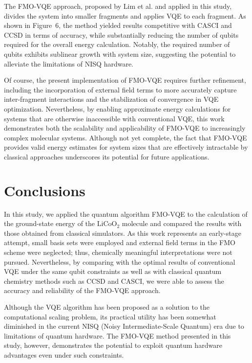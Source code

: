 \documentclass[pdflatex,sn-mathphys-num]{sn-jnl}%
\theoremstyle{thmstyleone}%
\theoremstyle{thmstyletwo}%
\theoremstyle{thmstylethree}%
\begin{document}
The FMO-VQE approach, proposed by Lim et al. and applied in this study, divides the system into smaller fragments and applies VQE to each fragment. As shown in Figure~6, the method yielded results competitive with CASCI and CCSD in terms of accuracy, while substantially reducing the number of qubits required for the overall energy calculation. Notably, the required number of qubits exhibits sublinear growth with system size, suggesting the potential to alleviate the limitations of NISQ hardware.

Of course, the present implementation of FMO-VQE requires further refinement, including the incorporation of external field terms to more accurately capture inter-fragment interactions and the stabilization of convergence in VQE optimization. Nevertheless, by enabling approximate energy calculations for systems that are otherwise inaccessible with conventional VQE, this work demonstrates both the scalability and applicability of FMO-VQE to increasingly complex molecular systems. Although not yet complete, the fact that FMO-VQE provides valid energy estimates for system sizes that are effectively intractable by classical approaches underscores its potential for future applications.


\section{Conclusions}
In this study, we applied the quantum algorithm FMO-VQE to the calculation of the ground-state energy of the \(\mathrm{LiCoO_2}\) molecule and compared the results with those obtained from classical simulators. As this work represents an early-stage attempt, small basis sets were employed and external field terms in the FMO scheme were neglected; thus, chemically meaningful interpretations were not pursued. Nevertheless, by comparing with the optimal results of conventional VQE under the same qubit constraints as well as with classical quantum chemistry methods such as CCSD and CASCI, we were able to assess the accuracy and reliability of the FMO-VQE approach.

Although the VQE algorithm has been proposed as a solution to the computational scaling problem, its practical utility has been somewhat diminished in the current NISQ (Noisy Intermediate-Scale Quantum) era due to limitations of quantum hardware. The FMO-VQE method presented in this study, however, demonstrates the potential to exploit quantum hardware advantages even under such constraints.
\end{document}
